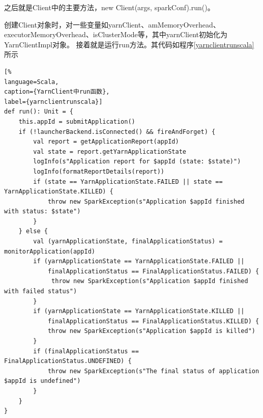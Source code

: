 之后就是Client中的主要方法，new Client(args, sparkConf).run()。

创建Client对象时，对一些变量如yarnClient、amMemoryOverhead、executorMemoryOverhead、isClusterMode等，其中yarnClient初始化为YarnClientImpl对象。
接着就是运行run方法。其代码如程序\ref{yarnclientrunscala}所示
\begin{lstlisting}[%
language=Scala,
caption={YarnClient中run函数},
label={yarnclientrunscala}]
def run(): Unit = {
	this.appId = submitApplication()
	if (!launcherBackend.isConnected() && fireAndForget) {
    	val report = getApplicationReport(appId)
    	val state = report.getYarnApplicationState
    	logInfo(s"Application report for $appId (state: $state)")
    	logInfo(formatReportDetails(report))
    	if (state == YarnApplicationState.FAILED || state == YarnApplicationState.KILLED) {
			throw new SparkException(s"Application $appId finished with status: $state")
		}
	} else {
    	val (yarnApplicationState, finalApplicationStatus) = monitorApplication(appId)
    	if (yarnApplicationState == YarnApplicationState.FAILED ||
      		finalApplicationStatus == FinalApplicationStatus.FAILED) {
     		 throw new SparkException(s"Application $appId finished with failed status")
    	}
    	if (yarnApplicationState == YarnApplicationState.KILLED ||
			finalApplicationStatus == FinalApplicationStatus.KILLED) {
      		throw new SparkException(s"Application $appId is killed")
    	}
    	if (finalApplicationStatus == FinalApplicationStatus.UNDEFINED) {
      		throw new SparkException(s"The final status of application $appId is undefined")
    	}
	}
}
\end{lstlisting}

